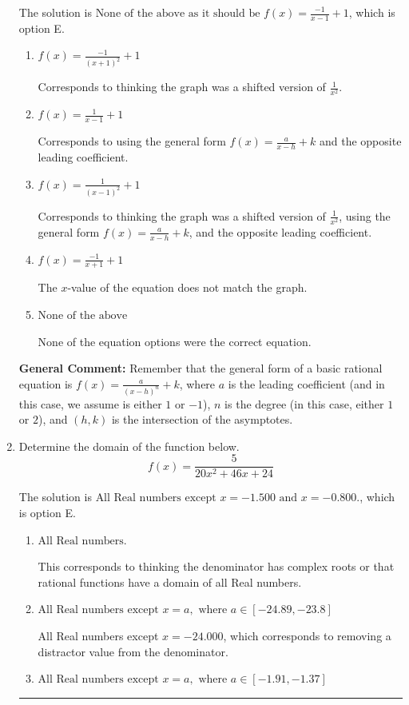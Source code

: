\documentclass{extbook}[14pt]
\newcommand{\litem}[1]{\item #1

\rule{\textwidth}{0.4pt}}
\begin{document}
\begin{enumerate}
{The solution is \( \text{None of the above as it should be } f(x) = \frac{-1}{x - 1} + 1 \), which is option E.\begin{enumerate}[label=\Alph*.]
\item \( f(x) = \frac{-1}{(x + 1)^2} + 1 \)

Corresponds to thinking the graph was a shifted version of $\frac{1}{x^2}$.
\item \( f(x) = \frac{1}{x - 1} + 1 \)

Corresponds to using the general form $f(x) = \frac{a}{x-h}+k$ and the opposite leading coefficient.
\item \( f(x) = \frac{1}{(x - 1)^2} + 1 \)

Corresponds to thinking the graph was a shifted version of $\frac{1}{x^2}$, using the general form $f(x) = \frac{a}{x-h}+k$, and the opposite leading coefficient.
\item \( f(x) = \frac{-1}{x + 1} + 1 \)

The $x$-value of the equation does not match the graph.
\item \( \text{None of the above} \)

None of the equation options were the correct equation.
\end{enumerate}

\textbf{General Comment:} Remember that the general form of a basic rational equation is $ f(x) = \frac{a}{(x-h)^n} + k$, where $a$ is the leading coefficient (and in this case, we assume is either $1$ or $-1$), $n$ is the degree (in this case, either $1$ or $2$), and $(h, k)$ is the intersection of the asymptotes.
}
\litem{
Determine the domain of the function below.
\[ f(x) = \frac{5}{20x^{2} +46 x + 24} \]

The solution is \( \text{All Real numbers except } x = -1.500 \text{ and } x = -0.800. \), which is option E.\begin{enumerate}[label=\Alph*.]
\item \( \text{All Real numbers.} \)

This corresponds to thinking the denominator has complex roots or that rational functions have a domain of all Real numbers.
\item \( \text{All Real numbers except } x = a, \text{ where } a \in [-24.89, -23.8] \)

All Real numbers except $x = -24.000$, which corresponds to removing a distractor value from the denominator.
\item \( \text{All Real numbers except } x = a, \text{ where } a \in [-1.91, -1.37] \)


\end{enumerate}}
\end{enumerate}
\end{document}

